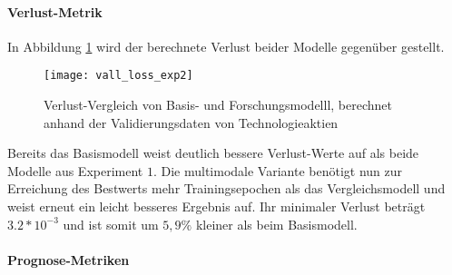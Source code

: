 \paragraph*{Verlust-Metrik} 
In Abbildung \ref{fig:vall_loss_exp2} wird der berechnete Verlust beider Modelle gegenüber gestellt.
\begin{figure}[H]
	\texttt{[image: vall\_loss\_exp2]}
	\caption{Verlust-Vergleich von Basis- und Forschungsmodelll, berechnet anhand der Validierungsdaten von Technologieaktien}
	\label{fig:vall_loss_exp2}
\end{figure}
Bereits das Basismodell weist deutlich bessere Verlust-Werte auf als beide Modelle aus Experiment $1$. Die multimodale Variante benötigt nun zur Erreichung des Bestwerts mehr Trainingsepochen als das Vergleichsmodell und weist erneut ein leicht besseres Ergebnis auf. Ihr minimaler Verlust beträgt $3.2*10^{-3}$ und ist somit um $5,9\%$ kleiner als beim Basismodell.

\paragraph*{Prognose-Metriken} 

